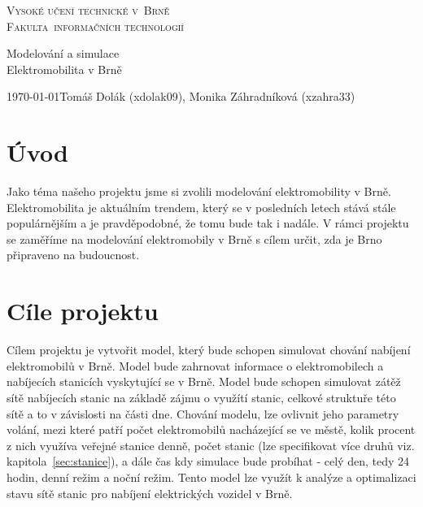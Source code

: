 \documentclass[a4paper,11pt]{article}
\begin{document}
\begin{titlepage}
    \begin{center}
        
        \Huge
        \textsc{Vysoké učení technické v~Brně}\\[0.1em]
        
        \huge
        \textsc{Fakulta~informačních technologií}
        
        
        \LARGE
        Modelování a simulace \\
        Elektromobilita v Brně

    \end{center}
    
    {\large \today \hfill Tomáš Dolák (xdolak09), Monika Záhradníková (xzahra33)}
\end{titlepage}

\newpage
\tableofcontents

\newpage
\label{firstpage}

\section{Úvod}
Jako téma našeho projektu jsme si zvolili modelování elektromobility v Brně. Elektromobilita je aktuálním trendem,
který se v posledních letech stává stále populárnějším a je pravděpodobné, že tomu bude tak i nadále.
V rámci projektu se zaměříme na modelování elektromobily v Brně s cílem určit, zda je Brno připraveno
na budoucnost.\cite{simlib_cpp}

\section{Cíle projektu}
Cílem projektu je vytvořit model, který bude schopen simulovat chování nabíjení elektromobilů 
v Brně. Model bude zahrnovat informace o elektromobilech a nabíjecích stanicích vyskytující se
v Brně. Model bude schopen simulovat zátěž sítě nabíjecích stanic na základě zájmu o využítí 
stanic, celkové struktuře této sítě a to v závislosti na části dne. Chování modelu, lze ovlivnit
jeho parametry volání, mezi které patří počet elektromobilů nacházející se ve městě, kolik 
procent z nich využíva veřejné stanice denně, počet stanic (lze specifikovat více druhů viz. 
kapitola~\ref{sec:stanice}), a dále čas kdy simulace bude probíhat - celý den, tedy 24 hodin, denní režim a noční
režim. Tento model lze využít k analýze a optimalizaci stavu sítě stanic pro nabíjení elektrických
vozidel v Brně.
\end{document}
